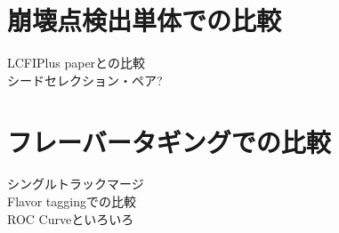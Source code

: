 \section{崩壊点検出単体での比較} \label{Com:ComparisonwithVF}

LCFIPlus paperとの比較\\
シードセレクション・ペア?\\

\section{フレーバータギングでの比較} \label{Com:DetailedComparisonandEvaluation}

シングルトラックマージ\\
Flavor taggingでの比較\\
ROC Curveといろいろ\\

